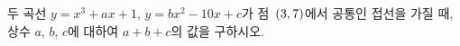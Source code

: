 두 곡선 $y=x^3+ax+1$, $y=bx^2-10x+c$가 점~$(3{,}\mkern3mu\mathopen{}7)$에서 공통인 접선을 가질 때, 상수 $a$, $b$, $c$에 대하여 $a+b+c$의 값을 구하시오.
